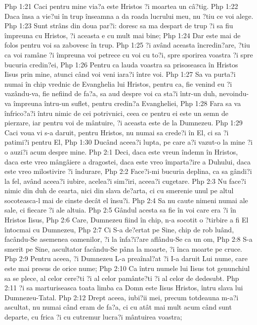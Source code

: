 Php 1:21  Caci pentru mine via?a este Hristos ?i moartea un câ?tig.
Php 1:22  Daca însa a vie?ui în trup înseamna a da roada lucrului meu, nu ?tiu ce voi alege.
Php 1:23  Sunt strâns din doua par?i: doresc sa ma despart de trup ?i sa fiu împreuna cu Hristos, ?i aceasta e cu mult mai bine;
Php 1:24  Dar este mai de folos pentru voi sa zabovesc în trup.
Php 1:25  ?i având aceasta încredin?are, ?tiu ca voi ramâne ?i împreuna voi petrece cu voi cu to?i, spre sporirea voastra ?i spre bucuria credin?ei,
Php 1:26  Pentru ca lauda voastra sa prisoseasca în Hristos Iisus prin mine, atunci când voi veni iara?i între voi.
Php 1:27  Sa va purta?i numai în chip vrednic de Evanghelia lui Hristos, pentru ca, fie venind eu ?i vazându-va, fie nefiind de fa?a, sa aud despre voi ca sta?i într-un duh, nevoindu-va împreuna întru-un suflet, pentru credin?a Evangheliei,
Php 1:28  Fara sa va înfrico?a?i întru nimic de cei potrivnici, ceea ce pentru ei este un semn de pierzare, iar pentru voi de mântuire, ?i aceasta este de la Dumnezeu.
Php 1:29  Caci voua vi s-a daruit, pentru Hristos, nu numai sa crede?i în El, ci sa ?i patimi?i pentru El,
Php 1:30  Ducând aceea?i lupta, pe care a?i vazut-o la mine ?i o auzi?i acum despre mine.
Php 2:1  Deci, daca este vreun îndemn în Hristos, daca este vreo mângâiere a dragostei, daca este vreo împarta?ire a Duhului, daca este vreo milostivire ?i îndurare,
Php 2:2  Face?i-mi bucuria deplina, ca sa gândi?i la fel, având aceea?i iubire, acelea?i sim?iri, aceea?i cugetare.
Php 2:3  Nu face?i nimic din duh de cearta, nici din slava de?arta, ci cu smerenie unul pe altul socoteasca-l mai de cinste decât el însu?i.
Php 2:4  Sa nu caute nimeni numai ale sale, ci fiecare ?i ale altuia.
Php 2:5  Gândul acesta sa fie în voi care era ?i în Hristos Iisus,
Php 2:6  Care, Dumnezeu fiind în chip, n-a socotit o ?tirbire a fi El întocmai cu Dumnezeu,
Php 2:7  Ci S-a de?ertat pe Sine, chip de rob luând, facându-Se asemenea oamenilor, ?i la înfa?i?are aflându-Se ca un om,
Php 2:8  S-a smerit pe Sine, ascultator facându-Se pâna la moarte, ?i înca moarte pe cruce.
Php 2:9  Pentru aceea, ?i Dumnezeu L-a preaînal?at ?i I-a daruit Lui nume, care este mai presus de orice nume;
Php 2:10  Ca întru numele lui Iisus tot genunchiul sa se plece, al celor cere?ti ?i al celor pamânte?ti ?i al celor de dedesubt.
Php 2:11  ?i sa marturiseasca toata limba ca Domn este Iisus Hristos, întru slava lui Dumnezeu-Tatal.
Php 2:12  Drept aceea, iubi?ii mei, precum totdeauna m-a?i ascultat, nu numai când eram de fa?a, ci cu atât mai mult acum când sunt departe, cu frica ?i cu cutremur lucra?i mântuirea voastra;
